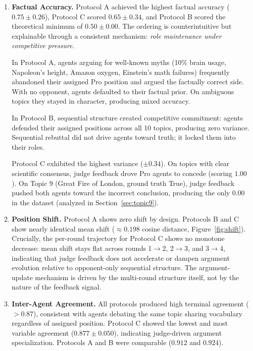 \documentclass[11pt, oneside]{article}
\begin{document}
\begin{enumerate}

\item \textbf{Factual Accuracy.}
Protocol A achieved the highest factual accuracy ($0.75 \pm 0.26$), Protocol C scored $0.65 \pm 0.34$, and Protocol B scored the theoretical minimum of $0.50 \pm 0.00$. The ordering is counterintuitive but explainable through a consistent mechanism: \emph{role maintenance under competitive pressure}.

In Protocol A, agents arguing for well-known myths (10\% brain usage, Napoleon's height, Amazon oxygen, Einstein's math failures) frequently abandoned their assigned Pro position and argued the factually correct side. With no opponent, agents defaulted to their factual prior. On ambiguous topics they stayed in character, producing mixed accuracy.

In Protocol B, sequential structure created competitive commitment: agents defended their assigned positions across all 10 topics, producing zero variance. Sequential rebuttal did not drive agents toward truth; it locked them into their roles.

Protocol C exhibited the highest variance ($\pm 0.34$). On topics with clear scientific consensus, judge feedback drove Pro agents to concede (scoring $1.00$). On Topic 9 (Great Fire of London, ground truth True), judge feedback pushed both agents toward the incorrect conclusion, producing the only $0.00$ in the dataset (analyzed in Section~\ref{sec:topic9}).

\item \textbf{Position Shift.}
Protocol A shows zero shift by design. Protocols B and C show nearly identical mean shift ($\approx 0.198$ cosine distance, Figure~\ref{fig:shift}). Crucially, the per-round trajectory for Protocol C shows no monotone decrease: mean shift stays flat across rounds 1$\to$2, 2$\to$3, and 3$\to$4, indicating that judge feedback does not accelerate or dampen argument evolution relative to opponent-only sequential structure. The argument-update mechanism is driven by the multi-round structure itself, not by the nature of the feedback signal.

\item \textbf{Inter-Agent Agreement.}
All protocols produced high terminal agreement ($> 0.87$), consistent with agents debating the same topic sharing vocabulary regardless of assigned position. Protocol C showed the lowest and most variable agreement ($0.877 \pm 0.050$), indicating judge-driven argument specialization. Protocols A and B were comparable ($0.912$ and $0.924$).


\end{enumerate}
\end{document}
